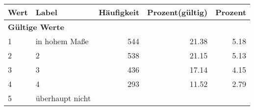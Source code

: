      \begin{longtable}{lXrrr}
     \toprule
     \textbf{Wert} & \textbf{Label} & \textbf{Häufigkeit} & \textbf{Prozent(gültig)} & \textbf{Prozent} \\
     \endhead
     \midrule
     \multicolumn{5}{l}{\textbf{Gültige Werte}}\\

     1 &
     \multicolumn{1}{X}{ in hohem Maße   } &


       \num{544} &
       \num[round-mode=places,round-precision=2]{21,38} &
         \num[round-mode=places,round-precision=2]{5,18} \\

     2 &
     \multicolumn{1}{X}{ 2   } &


       \num{538} &
       \num[round-mode=places,round-precision=2]{21,15} &
         \num[round-mode=places,round-precision=2]{5,13} \\

     3 &
     \multicolumn{1}{X}{ 3   } &


       \num{436} &
       \num[round-mode=places,round-precision=2]{17,14} &
         \num[round-mode=places,round-precision=2]{4,15} \\

     4 &
     \multicolumn{1}{X}{ 4   } &


       \num{293} &
       \num[round-mode=places,round-precision=2]{11,52} &
         \num[round-mode=places,round-precision=2]{2,79} \\

     5 &
     \multicolumn{1}{X}{ überhaupt nicht   } &



\end{longtable}
